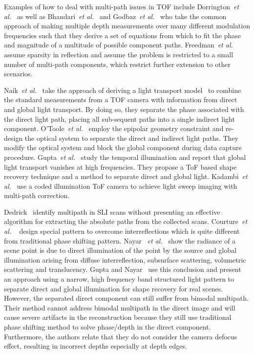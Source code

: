 \documentclass[10pt]{article}
\begin{document}
Examples of how to deal with multi-path issues in TOF include Dorrington~{\it et al.}~\cite{dorrington2011separating} as well as Bhandari~{\it et al.}~\cite{bhandari2013multifrequency} and Godbaz~{\it et al.}~\cite{godbaz2012closed} who take the common approach of making multiple depth measurements over many different modulation frequencies such that they derive a set of equations from which to fit the phase and magnitude of a multitude of possible component paths. Freedman~{\it et al.}~\cite{freedman2014sra} assume sparsity in reflection and assume the problem is restricted to a small number of multi-path components, which restrict further extension to other scenarios. 

Naik~{\it et al.}~\cite{naik2015light} take the approach of deriving a light transport model~\cite{Nayar:2006:FSD:1141911.1141977} to combine the standard measurements from a TOF camera with information from direct and global light transport.  By doing so, they separate the phase associated with the direct light path, placing all sub-sequent paths into a single indirect light component.  O'Toole~{\it et al.}~\cite{o20143d,o2014temporal} employ the epipolar geometry constraint and re-design the optical system to separate the direct and indirect light paths. They modify the optical system and block the global component during data capture procedure.  Gupta~{\it et al.}~\cite{gupta2015phasor} study the temporal illumination and report that global light transport vanishes at high frequencies. They propose a ToF based shape recovery technique and a method to separate direct and global light. Kadambi~{\it et al.}~\cite{kadambi2013coded} use a coded illumination ToF camera to achieve light sweep imaging with multi-path correction. 

Dedrick~\cite{dedrick2011improving} identify multipath in SLI scans without presenting an effective algorithm for extracting the absolute paths from the collected scans. Courture~{\it et al.} ~\cite{couture2011unstructured} design special pattern to overcome interreflections which is quite different from traditional phase shifting pattern. Nayar ~{\it et al.}~\cite{nayar2006fast} show the radiance of a scene point is due to direct illumination of the point by the source and global illumination arising from diffuse interreflection, subsurface scattering, volumetric scattering and translucency. Gupta and Nayar~\cite{gupta2012micro} use this conclusion and present an approach using a narrow, high frequency band structured light pattern to separate direct and global illumination for shape recovery for real scenes. However, the separated direct component can still suffer from bimodal multipath. Their method cannot address bimodal multipath in the direct image and will cause severe artifacts in the reconstruction because they still use traditional phase shifting method to solve phase/depth in the direct component. Furthermore, the authors relate that they do not consider the camera defocus effect, resulting in incorrect depths especially at depth edges. 
\end{document}
